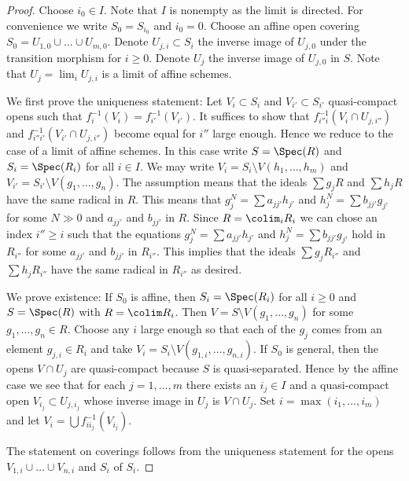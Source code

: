 \begin{proof}
Choose $i_0 \in I$. Note that $I$ is nonempty as the limit is directed.
For convenience we write $S_0 = S_{i_0}$ and $i_0 = 0$.
Choose an affine open covering $S_0 = U_{1, 0} \cup \ldots \cup U_{m, 0}$.
Denote $U_{j, i} \subset S_i$ the inverse image of $U_{j, 0}$
under the transition morphism for $i \geq 0$.
Denote $U_j$ the inverse image of $U_{j, 0}$ in $S$.
Note that $U_j = \lim_i U_{j, i}$ is a limit of affine
schemes.

\medskip\noindent
We first prove the uniqueness statement: Let
$V_i \subset S_i$ and $V_{i'} \subset S_{i'}$
quasi-compact opens such that $f_i^{-1}(V_i) = f_{i'}^{-1}(V_{i'})$.
It suffices to show that $f_{i''i}^{-1}(V_i \cap U_{j, i''})$ and
$f_{i''i'}^{-1}(V_{i'} \cap U_{j, i''})$ become equal
for $i''$ large enough. Hence we reduce to the case
of a limit of affine schemes. In this case write
$S = \Spec(R)$ and $S_i = \Spec(R_i)$ for all $i \in I$.
We may write $V_i = S_i \setminus V(h_1, \ldots, h_m)$
and $V_{i'} = S_{i'} \setminus V(g_1, \ldots, g_n)$.
The assumption means that the ideals
$\sum g_jR$ and $\sum h_jR$ have the same radical
in $R$. This means that $g_j^N = \sum a_{jj'}h_{j'}$ and
$h_j^N = \sum b_{jj'} g_{j'}$ for some $N \gg 0$ and $a_{jj'}$
and $b_{jj'}$ in $R$.
Since $R = \colim_i R_i$ we can chose an index
$i'' \geq i$ such that the equations
$g_j^N = \sum a_{jj'}h_{j'}$ and
$h_j^N = \sum b_{jj'} g_{j'}$ hold in $R_{i''}$ for some
$a_{jj'}$ and $b_{jj'}$ in $R_{i''}$. This implies that
the ideals $\sum g_jR_{i''}$ and $\sum h_jR_{i''}$ have the same radical
in $R_{i''}$ as desired.

\medskip\noindent
We prove existence: If $S_0$ is affine, then $S_i = \Spec(R_i)$ for all
$i \geq 0$ and $S = \Spec(R)$ with $R = \colim R_i$. Then
$V = S \setminus V(g_1, \ldots, g_n)$ for some $g_1, \ldots, g_n \in R$.
Choose any $i$ large enough so that each of the $g_j$ comes from an
element $g_{j, i} \in R_i$ and take
$V_i = S_i \setminus V(g_{1, i}, \ldots, g_{n, i})$.
If $S_0$ is general, then the opens $V \cap U_j$
are quasi-compact because $S$ is quasi-separated. Hence by the
affine case we see that for each $j = 1, \ldots, m$
there exists an $i_j \in I$ and a quasi-compact open
$V_{i_j} \subset U_{j, i_j}$ whose inverse image in $U_j$
is $V \cap U_j$. Set $i = \max(i_1, \ldots, i_m)$
and let $V_i = \bigcup f_{ii_j}^{-1}(V_{i_j})$.

\medskip\noindent
The statement on coverings follows from the uniqueness statement
for the opens $V_{1, i} \cup \ldots \cup V_{n, i}$ and $S_i$ of $S_i$.
\end{proof}

